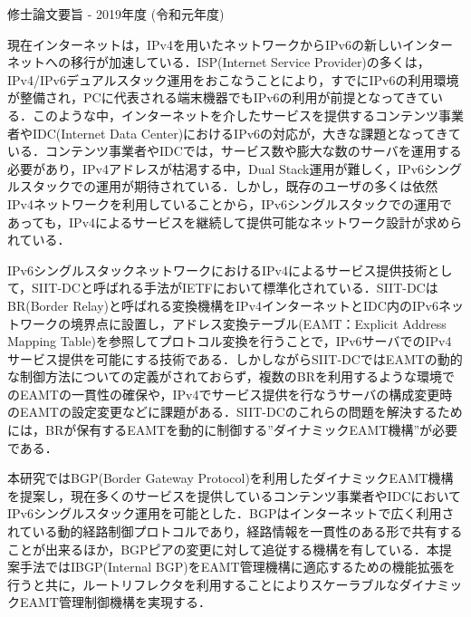 修士論文要旨 - 2019年度 (令和元年度)
\begin{center}
\begin{large}
\end{large}
\end{center}

現在インターネットは，IPv4を用いたネットワークからIPv6の新しいインターネットへの移行が加速している．ISP(Internet Service Provider)の多くは，IPv4/IPv6デュアルスタック運用をおこなうことにより，すでにIPv6の利用環境が整備され，PCに代表される端末機器でもIPv6の利用が前提となってきている．このような中，インターネットを介したサービスを提供するコンテンツ事業者やIDC(Internet Data Center)におけるIPv6の対応が，大きな課題となってきている．コンテンツ事業者やIDCでは，サービス数や膨大な数のサーバを運用する必要があり，IPv4アドレスが枯渇する中，Dual Stack運用が難しく，IPv6シングルスタックでの運用が期待されている．しかし，既存のユーザの多くは依然IPv4ネットワークを利用していることから，IPv6シングルスタックでの運用であっても，IPv4によるサービスを継続して提供可能なネットワーク設計が求められている．

IPv6シングルスタックネットワークにおけるIPv4によるサービス提供技術として，SIIT-DCと呼ばれる手法がIETFにおいて標準化されている．SIIT-DCはBR(Border Relay)と呼ばれる変換機構をIPv4インターネットとIDC内のIPv6ネットワークの境界点に設置し，アドレス変換テーブル(EAMT：Explicit Address Mapping Table)を参照してプロトコル変換を行うことで，IPv6サーバでのIPv4サービス提供を可能にする技術である．しかしながらSIIT-DCではEAMTの動的な制御方法についての定義がされておらず，複数のBRを利用するような環境でのEAMTの一貫性の確保や，IPv4でサービス提供を行なうサーバの構成変更時のEAMTの設定変更などに課題がある．SIIT-DCのこれらの問題を解決するためには，BRが保有するEAMTを動的に制御する”ダイナミックEAMT機構”が必要である．

本研究ではBGP(Border Gateway Protocol)を利用したダイナミックEAMT機構を提案し，現在多くのサービスを提供しているコンテンツ事業者やIDCにおいてIPv6シングルスタック運用を可能とした．BGPはインターネットで広く利用されている動的経路制御プロトコルであり，経路情報を一貫性のある形で共有することが出来るほか，BGPピアの変更に対して追従する機構を有している．本提案手法ではIBGP(Internal BGP)をEAMT管理機構に適応するための機能拡張を行うと共に，ルートリフレクタを利用することによりスケーラブルなダイナミックEAMT管理制御機構を実現する．

